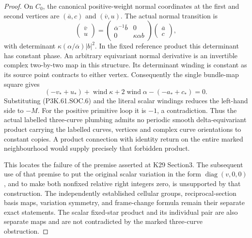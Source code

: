 \begin{proof}
On \(C_0\), the canonical positive-weight normal coordinates at the
first and second vertices are \((\overline a,c)\) and
\((\overline v,u)\). The actual normal transition is
\[
 \begin{pmatrix}\overline v\\u\end{pmatrix}
 =\begin{pmatrix}
 \overline\alpha^{-1}\overline b&0\\0&\kappa\alpha b
 \end{pmatrix}
 \begin{pmatrix}\overline a\\c\end{pmatrix},
\]
with determinant \(\kappa(\alpha/\overline\alpha)|b|^2\).
In the fixed reference product this determinant has constant phase.
An arbitrary equivariant normal derivative is an invertible complex
two-by-two map in this structure. Its determinant winding is constant
as its source point contracts to either vertex. Consequently the
single bundle-map square gives
\[
 (-v_*+u_*)+\operatorname{wind}\kappa
   +2\operatorname{wind}\alpha-(-a_*+c_*)=0.
 \tag{P3K.61.SOC.7}
\]
Substituting (P3K.61.SOC.6) and the literal scalar windings reduces the
left-hand side to \(-M\). For the positive primitive loop it is
\(-1\), a contradiction. Thus the actual labelled three-curve
plumbing admits no periodic smooth delta-equivariant product carrying
the labelled curves, vertices and complex curve orientations to
constant copies. A product connection with identity return on the
entire marked neighbourhood would supply precisely that forbidden
product.

This locates the failure of the premise asserted at K29 Section3.
The subsequent use of that premise to put the original scalar
variation in the form \(\operatorname{diag}(v,0,0)\), and to make
both nonfixed relative right integers zero, is unsupported by that
construction. The independently established cellular groups,
reciprocal-section basis maps, variation symmetry, and frame-change
formula remain their separate exact statements. The scalar fixed-star
product and its individual pair are also separate maps and are not
contradicted by the marked three-curve obstruction.
\end{proof}
